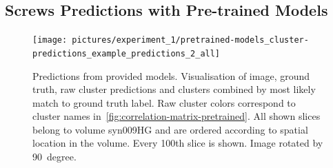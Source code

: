 \clearpage

\clearpage
\subsection{Screws Predictions with Pre-trained Models}
\begin{figure}[!htb]
    \centering
    \texttt{[image: pictures/experiment\_1/pretrained-models\_cluster-predictions\_example\_predictions\_2\_all]}\\
    \caption[Predictions from Provided Models]{Predictions from provided models. Visualisation of image, ground truth, raw cluster predictions and clusters combined by most likely match to ground truth label. Raw cluster colors correspond to cluster names in~\autoref{fig:correlation-matrix-pretrained}. All shown slices belong to volume syn009HG and are ordered according to spatial location in the volume. Every 100th slice is shown. Image rotated by 90~degree.}
    \label{fig:pretrained-predictions_syn009}
\end{figure}
\clearpage

